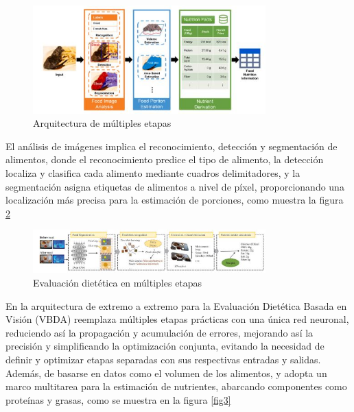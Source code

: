\begin{figure}[h]
		\begin{center}
			\includegraphics[width=0.8\textwidth]{2/imagen2/6FIGURA6PAPER2.JPG}
			\caption{Arquitectura de múltiples etapas}
			\label{fig1}
		\end{center}
		
	\end{figure}

\thinspace

El análisis de imágenes implica el reconocimiento, detección y segmentación de alimentos, donde el reconocimiento predice el tipo de alimento, la detección localiza y clasifica cada alimento mediante cuadros delimitadores, y la segmentación asigna etiquetas de alimentos a nivel de píxel, proporcionando una localización más precisa para la estimación de porciones, como muestra la figura \ref{fig2}

\begin{figure}[h]
		\begin{center}
			\includegraphics[width=0.8\textwidth]{2/imagen2/8FIGURA8PAPER2.JPG}
			\caption{Evaluación dietética en múltiples etapas}
			\label{fig2}
		\end{center}
		
	\end{figure}

\thinspace

En la arquitectura de extremo a extremo para la Evaluación Dietética Basada en Visión (VBDA) reemplaza múltiples etapas prácticas con una única red neuronal, reduciendo así la propagación y acumulación de errores, mejorando así la precisión y simplificando la optimización conjunta, evitando la necesidad de definir y optimizar etapas separadas con sus respectivas entradas y salidas. Además, de basarse en datos como el volumen de los alimentos, y adopta un marco multitarea para la estimación de nutrientes, abarcando componentes como proteínas y grasas, como se muestra en la figura \ref{fig3}
 
